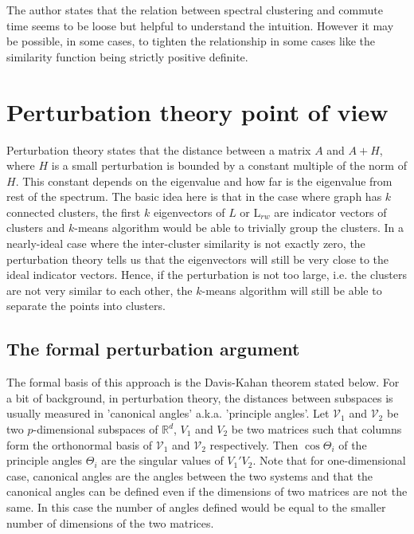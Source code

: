 \documentclass[10pt,a4paper, nocenter]{report}
\begin{document}
	The author states that the relation between spectral clustering and commute time seems to be loose but helpful to understand the intuition. However it may be possible, in some cases, to tighten the relationship in some cases like the similarity function being strictly positive definite.
	
	
	\chapter{Perturbation theory point of view}
	Perturbation theory states that the distance between a matrix $A$ and $A+H$, where $H$ is a small perturbation is bounded by a constant multiple of the norm of $H$. This constant depends on the eigenvalue and how far is the eigenvalue from rest of the spectrum. The basic idea here is that in the case where graph has $k$ connected clusters, the first $k$ eigenvectors of $L$ or L$_{rw}$ are indicator vectors of clusters and $k$-means algorithm would be able to trivially group the clusters. In a nearly-ideal case where the inter-cluster similarity is not exactly zero, the perturbation theory tells us that the eigenvectors will still be very close to the ideal indicator vectors. Hence, if the perturbation is not too large, i.e. the clusters are not very similar to each other, the $k$-means algorithm will still be able to separate the points into clusters.
	
	\section{The formal perturbation argument}
	The formal basis of this approach is the Davis-Kahan theorem stated below. For a bit of background, in perturbation theory, the distances between subspaces is usually measured in 'canonical angles' a.k.a. 'principle angles'. Let $ \mathcal{V}_{1} $ and $\mathcal{V}_{2}$ be two $p$-dimensional subspaces of $\mathbb{R}^{d}$, $V_{1}$ and $V_{2}$ be two matrices such that columns form the orthonormal basis of $\mathcal{V}_{1}$ and $\mathcal{V}_{2}$ respectively. Then $\cos\Theta_{i}$ of the principle angles $\Theta_{i}$ are the singular values of $V_{1}'V_{2}$. Note that for one-dimensional case, canonical angles are the angles between the two systems and that the canonical angles can be defined even if the dimensions of two matrices are not the same. In this case the number of angles defined would be equal to the smaller number of dimensions of the two matrices. 
	
\end{document}
